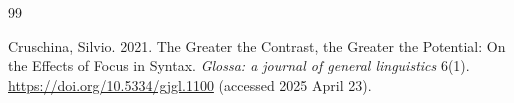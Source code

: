\documentclass[a4paper, ruler]{CUP-JNL-LIN}%
\begin{document}
\begin{Backmatter}
\begin{thebibliography}{99}

{Cruschina, Silvio}. 2021. The Greater the Contrast, the Greater the Potential: On the Effects of Focus in Syntax. \textit{Glossa: a journal of general linguistics} 6(1). \url{https://doi.org/10.5334/gjgl.1100} (accessed 2025 April 23).





\end{thebibliography}
\end{Backmatter}
\end{document}
